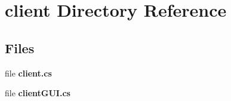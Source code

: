\section{client Directory Reference}
\label{dir_db3a54907829b36871118d03417739cd}
\subsection*{Files}
\begin{DoxyCompactItemize}
\item 
file {\bf client.\-cs}
\item 
file {\bf client\-G\-U\-I.\-cs}
\end{DoxyCompactItemize}

